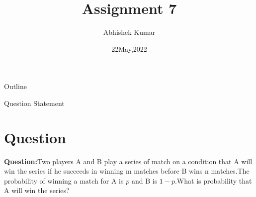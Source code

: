 \documentclass{beamer}
\title{Assignment 7}
\author{Abhishek Kumar}
\institute{IIT Hyderabad}
\date{22May,2022}
\begin{document}
\begin{frame}
		\titlepage
	\end{frame}
	\begin{frame}{Outline}
		\tableofcontents
	\end{frame}
\begin{frame}{Question Statement}
\section{Question}
\textbf{Question:}Two players A and B play a series of match on a condition that A will win the series if he succeeds in winning m matches before B wins n matches.The probability of winning a match for A is $p$ and B is $1-p$.What is probability that A will win the series?
\end{frame}
\end{document}
